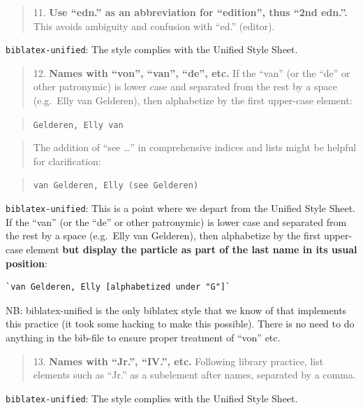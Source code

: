 \documentclass[
]{article}
\begin{document}
\begin{quote}
11. \textbf{Use ``edn.'' as an abbreviation for ``edition'', thus ``2nd
edn.''.} This avoids ambiguity and confusion with ``ed.'' (editor).
\end{quote}

\texttt{biblatex-unified}: The style complies with the Unified Style
Sheet.

\begin{quote}
12. \textbf{Names with ``von'', ``van'', ``de'', etc.} If the ``van''
(or the ``de'' or other patronymic) is lower case and separated from the
rest by a space (e.g.~Elly van Gelderen), then alphabetize by the first
upper-case element:
\end{quote}

\begin{quote}
\texttt{Gelderen,\ Elly\ van}
\end{quote}

\begin{quote}
The addition of ``see \ldots{}'' in comprehensive indices and lists
might be helpful for clarification:
\end{quote}

\begin{quote}
\texttt{van\ Gelderen,\ Elly\ (see\ Gelderen)}
\end{quote}

\texttt{biblatex-unified}: This is a point where we depart from the
Unified Style Sheet. If the ``van'' (or the ``de'' or other patronymic)
is lower case and separated from the rest by a space (e.g.~Elly van
Gelderen), then alphabetize by the first upper-case element \textbf{but
display the particle as part of the last name in its usual position}:

\begin{verbatim}
`van Gelderen, Elly [alphabetized under "G"]`
\end{verbatim}

NB: biblatex-unified is the only biblatex style that we know of that
implements this practice (it took some hacking to make this possible).
There is no need to do anything in the bib-file to ensure proper
treatment of ``von'' etc.

\begin{quote}
13. \textbf{Names with ``Jr.'', ``IV.'', etc.} Following library
practice, list elements such as ``Jr.'' as a subelement after names,
separated by a comma.
\end{quote}

\texttt{biblatex-unified}: The style complies with the Unified Style
Sheet.
\end{document}
